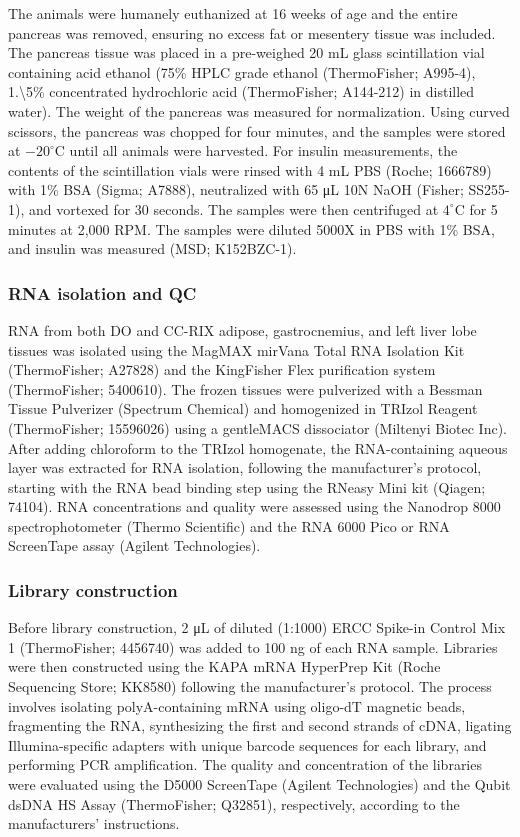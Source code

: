 \documentclass[
]{article}
\begin{document}
The animals were humanely euthanized at 16 weeks of age and the entire
pancreas was removed, ensuring no excess fat or mesentery tissue was
included. The pancreas tissue was placed in a pre-weighed 20 mL glass
scintillation vial containing acid ethanol (75\% HPLC grade ethanol
(ThermoFisher; A995-4), 1.\textbackslash5\% concentrated hydrochloric
acid (ThermoFisher; A144-212) in distilled water). The weight of the
pancreas was measured for normalization. Using curved scissors, the
pancreas was chopped for four minutes, and the samples were stored at
\(-20^{\circ}\)C until all animals were harvested. For insulin
measurements, the contents of the scintillation vials were rinsed with 4
mL PBS (Roche; 1666789) with 1\% BSA (Sigma; A7888), neutralized with 65
\si{\micro\liter} 10N NaOH (Fisher; SS255-1), and vortexed for 30
seconds. The samples were then centrifuged at \(4^{\circ}\)C for 5
minutes at 2,000 RPM. The samples were diluted 5000X in PBS with 1\%
BSA, and insulin was measured (MSD; K152BZC-1).

\subsubsection{RNA isolation and QC}\label{rna-isolation-and-qc}

RNA from both DO and CC-RIX adipose, gastrocnemius, and left liver lobe
tissues was isolated using the MagMAX mirVana Total RNA Isolation Kit
(ThermoFisher; A27828) and the KingFisher Flex purification system
(ThermoFisher; 5400610). The frozen tissues were pulverized with a
Bessman Tissue Pulverizer (Spectrum Chemical) and homogenized in
TRIzol\textsuperscript{\texttrademark} Reagent (ThermoFisher; 15596026)
using a gentleMACS dissociator (Miltenyi Biotec Inc). After adding
chloroform to the TRIzol homogenate, the RNA-containing aqueous layer
was extracted for RNA isolation, following the manufacturer's protocol,
starting with the RNA bead binding step using the RNeasy Mini kit
(Qiagen; 74104). RNA concentrations and quality were assessed using the
Nanodrop 8000 spectrophotometer (Thermo Scientific) and the RNA 6000
Pico or RNA ScreenTape assay (Agilent Technologies).

\subsubsection{Library construction}\label{library-construction}

Before library construction, 2 \si{\micro\liter} of diluted (1:1000)
ERCC Spike-in Control Mix 1 (ThermoFisher; 4456740) was added to 100 ng
of each RNA sample. Libraries were then constructed using the KAPA mRNA
HyperPrep Kit (Roche Sequencing Store; KK8580) following the
manufacturer's protocol. The process involves isolating polyA-containing
mRNA using oligo-dT magnetic beads, fragmenting the RNA, synthesizing
the first and second strands of cDNA, ligating Illumina-specific
adapters with unique barcode sequences for each library, and performing
PCR amplification. The quality and concentration of the libraries were
evaluated using the D5000 ScreenTape (Agilent Technologies) and the
Qubit dsDNA HS Assay (ThermoFisher; Q32851), respectively, according to
the manufacturers' instructions.
\end{document}
